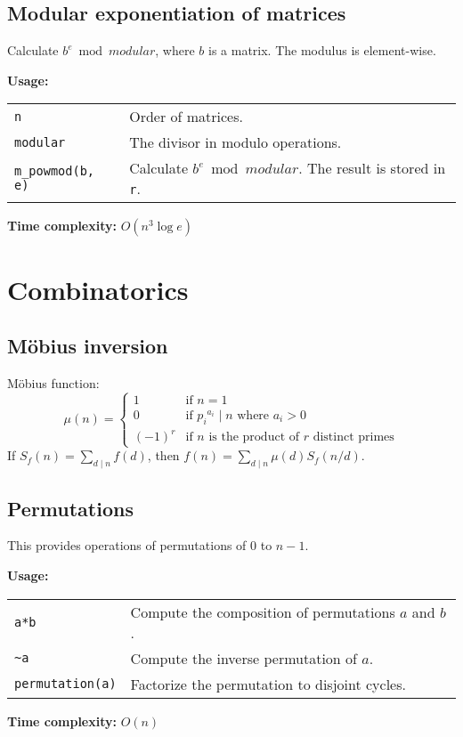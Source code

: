 \subsection{Modular exponentiation of matrices}
Calculate $b^e \bmod modular$, where $b$ is a matrix. The modulus is element-wise.\par
\textbf{Usage:} \\[0.1cm]
\begin{tabular}{p{3cm} p{8.5cm}}
  \lstinline|n| & Order of matrices. \\
  \lstinline|modular| & The divisor in modulo operations. \\
  \lstinline|m_powmod(b, e)| & Calculate $b^e \bmod modular$. The result is stored in \lstinline|r|.
\end{tabular} \par
\textbf{Time complexity:} $O(n^3 \log e)$ \par


\section{Combinatorics}
\subsection{M\"{o}bius inversion}
M\"{o}bius function:
$$ \mu(n) = \begin{cases} 1 & \text{if } n=1  \\ 0 & \text{if } {p_i}^{a_i} \mid n \text{ where } a_i > 0 \\ (-1)^r & \text{if } n \text{ is the product of } r \text{ distinct primes} \end{cases} $$
If $S_f(n) = \sum_{d \mid n} f(d)$, then $f(n) = \sum_{d \mid n} \mu(d) S_f(n/d)$.

\subsection{Permutations}
This provides operations of permutations of $0$ to $n-1$. \par
\textbf{Usage:} \\[0.1cm]
\begin{tabular}{p{3cm} p{8.5cm}}
  \lstinline|a*b| & Compute the composition of permutations $a$ and $b$. \\
  \lstinline|~a| & Compute the inverse permutation of $a$. \\
  \lstinline|permutation(a)| & Factorize the permutation to disjoint cycles.
\end{tabular} \par
\textbf{Time complexity:} $O(n)$ \par


